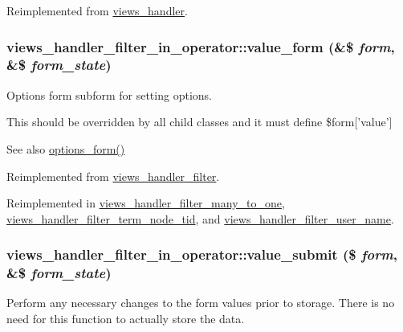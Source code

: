 Reimplemented from \hyperlink{classviews__handler_a323961657c7c5f3257a8fe4eeea1502f}{views\_\-handler}.\hypertarget{classviews__handler__filter__in__operator_a6736083657cad0f8c7299b000f2b8e60}{
\subsubsection[{value\_\-form}]{\setlength{\rightskip}{0pt plus 5cm}views\_\-handler\_\-filter\_\-in\_\-operator::value\_\-form (\&\$ {\em form}, \/  \&\$ {\em form\_\-state})}}
\label{classviews__handler__filter__in__operator_a6736083657cad0f8c7299b000f2b8e60}
Options form subform for setting options.

This should be overridden by all child classes and it must define \$form\mbox{[}'value'\mbox{]}

\begin{DoxySeeAlso}{See also}
\hyperlink{classviews__handler__filter_af14c69367162057a32709a6340de0988}{options\_\-form()} 
\end{DoxySeeAlso}


Reimplemented from \hyperlink{classviews__handler__filter_a9168b39edae84b20e01a3fd0d810ba66}{views\_\-handler\_\-filter}.

Reimplemented in \hyperlink{classviews__handler__filter__many__to__one_a6c5e3bbabc2ed73418f835195c10f451}{views\_\-handler\_\-filter\_\-many\_\-to\_\-one}, \hyperlink{classviews__handler__filter__term__node__tid_a3259d8a91cb0c13c51c02942b267b131}{views\_\-handler\_\-filter\_\-term\_\-node\_\-tid}, and \hyperlink{classviews__handler__filter__user__name_a08bc953c1682728eb0d38e5592a3286e}{views\_\-handler\_\-filter\_\-user\_\-name}.\hypertarget{classviews__handler__filter__in__operator_af7b01b1f4e53aec7f4b1065606819624}{
\subsubsection[{value\_\-submit}]{\setlength{\rightskip}{0pt plus 5cm}views\_\-handler\_\-filter\_\-in\_\-operator::value\_\-submit (\$ {\em form}, \/  \&\$ {\em form\_\-state})}}
\label{classviews__handler__filter__in__operator_af7b01b1f4e53aec7f4b1065606819624}
Perform any necessary changes to the form values prior to storage. There is no need for this function to actually store the data. 

